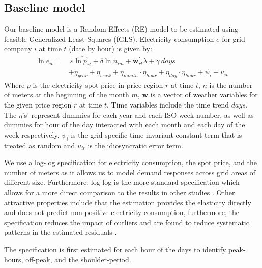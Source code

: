 \label{sec:empirical}
\subsection{Baseline model}
\label{subsec:e_model}
Our baseline model is a Random Effects (RE) model to be estimated using feasible Generalized Least Squares (fGLS). Electricity consumption $e$ for grid company $i$ at time $t$ (date by hour) is given by:
\begin{equation}
  \begin{split}
  \ln e_{it}=&\ \varepsilon \hat{\ln p_{rt}}+\delta\ln n_{im}+\bm{w}^{'}_{rt}\lambda+\gamma\ days\\
  &+\eta_{year}+\eta_{week}+\eta_{month}\cdot\eta_{hour}+\eta_{day}\cdot\eta_{hour}+\psi_i+u_{it}
  \end{split}
  \label{eq:baseline}
\end{equation}
Where $p$ is the electricity spot price in price region $r$ at time $t$, $n$ is the number of meters at the beginning of the month $m$, $\bm{w}$ is a vector of weather variables for the given price region $r$ at time $t$. Time variables include the time trend $days$. The $\eta$'s' represent dummies for each year and each ISO week number, as well as dummies for hour of the day interacted with each month and each day of the week respectively. $\psi_i$ is the grid-specific time-invariant constant term that is treated as random and $u_{it}$ is the idiosyncratic error term.
\par
We use a log-log specification for electricity consumption, the spot price, and the number of meters as it allows us to model demand responses across grid areas of different size. Furthermore, log-log is the more standard specification which allows for a more direct comparison to the results in other studies \citep{burke2017price}. Other attractive properties include that the estimation provides the elasticity directly and does not predict non-positive electricity consumption, furthermore, the specification reduces the impact of outliers and are found to reduce systematic patterns in the estimated residuals \citep{burke2017price}.
\par
The specification is first estimated for each hour of the days to identify peak-hours, off-peak, and the shoulder-period.


